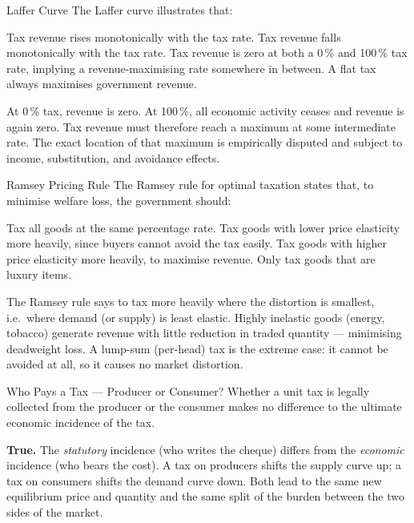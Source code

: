 \documentclass[paper=a5]{scrartcl}
\begin{document}
\begin{question}[type=mc]{Laffer Curve}
The Laffer curve illustrates that:
\begin{choices}
  \choice        Tax revenue rises monotonically with the tax rate.
  \choice        Tax revenue falls monotonically with the tax rate.
  \correctchoice Tax revenue is zero at both a 0\,\% and 100\,\% tax rate,
                 implying a revenue-maximising rate somewhere in between.
  \choice        A flat tax always maximises government revenue.
\end{choices}
\begin{solution}
  At 0\,\% tax, revenue is zero. At 100\,\%, all economic activity ceases and
  revenue is again zero. Tax revenue must therefore reach a maximum at some
  intermediate rate. The exact location of that maximum is empirically disputed
  and subject to income, substitution, and avoidance effects.
\end{solution}
\end{question}

\begin{question}[type=mc]{Ramsey Pricing Rule}
The Ramsey rule for optimal taxation states that, to minimise welfare loss,
the government should:
\begin{choices}
  \choice        Tax all goods at the same percentage rate.
  \correctchoice Tax goods with lower price elasticity more heavily, since
                 buyers cannot avoid the tax easily.
  \choice        Tax goods with higher price elasticity more heavily, to
                 maximise revenue.
  \choice        Only tax goods that are luxury items.
\end{choices}
\begin{solution}
  The Ramsey rule says to tax more heavily where the distortion is smallest,
  i.e.\ where demand (or supply) is least elastic. Highly inelastic goods
  (energy, tobacco) generate revenue with little reduction in traded quantity
  — minimising deadweight loss. A lump-sum (per-head) tax is the extreme case:
  it cannot be avoided at all, so it causes no market distortion.
\end{solution}
\end{question}

\begin{question}[type=tf]{Who Pays a Tax — Producer or Consumer?}
Whether a unit tax is legally collected from the producer or the consumer
makes no difference to the ultimate economic incidence of the tax.
\truefalse[true]
\begin{solution}
  \textbf{True.} The \emph{statutory} incidence (who writes the cheque) differs
  from the \emph{economic} incidence (who bears the cost). A tax on producers
  shifts the supply curve up; a tax on consumers shifts the demand curve down.
  Both lead to the same new equilibrium price and quantity and the same split
  of the burden between the two sides of the market.
\end{solution}
\end{question}
\end{document}
